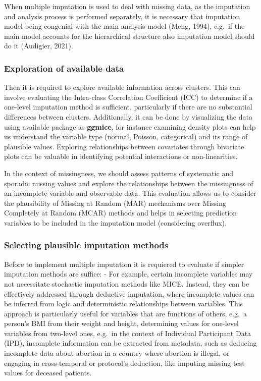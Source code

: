 \documentclass[
]{jss}
\begin{document}
When multiple imputation is used to deal with missing data, as the
imputation and analysis process is performed separately, it is necessary
that imputation model being congenial with the main analysis model
(Meng, 1994), e.g.~if the main model accounts for the hierarchical
structure also imputation model should do it (Audigier, 2021).

\hypertarget{exploration-of-available-data}{%
\subsubsection{Exploration of available
data}\label{exploration-of-available-data}}

Then it is required to explore available information across clusters.
This can involve evaluating the Intra-class Correlation Coefficient
(ICC) to determine if a one-level imputation method is sufficient,
particularly if there are no substantial differences between clusters.
Additionally, it can be done by visualizing the data using available
package as \textbf{ggmice}, for instance examining density plots can
help us understand the variable type (normal, Poisson, categorical) and
its range of plausible values. Exploring relationships between
covariates through bivariate plots can be valuable in identifying
potential interactions or non-linearities.

In the context of missingness, we should assess patterns of systematic
and sporadic missing values and explore the relationships between the
missingness of an incomplete variable and observable data. This
evaluation allows us to consider the plausibility of Missing at Random
(MAR) mechanisms over Missing Completely at Random (MCAR) methods and
helps in selecting prediction variables to be included in the imputation
model (considering overflux).

\hypertarget{selecting-plausible-imputation-methods}{%
\subsubsection{Selecting plausible imputation
methods}\label{selecting-plausible-imputation-methods}}

Before to implement multiple imputation it is requiered to evaluate if
simpler imputation methods are suffice: - For example, certain
incomplete variables may not necessitate stochastic imputation methods
like MICE. Instead, they can be effectively addressed through deductive
imputation, where incomplete values can be inferred from logic and
deterministic relationships between variables. This approach is
particularly useful for variables that are functions of others, e.g.~a
person's BMI from their weight and height, determining values for
one-level variables from two-level ones, e.g.~in the context of
Individual Participant Data (IPD), incomplete information can be
extracted from metadata, such as deducing incomplete data about abortion
in a country where abortion is illegal, or engaging in cross-temporal or
protocol's deduction, like imputing missing test values for deceased
patients.
\end{document}
